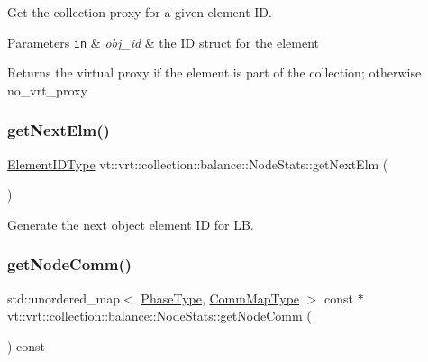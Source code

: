 Get the collection proxy for a given element ID. 


\begin{DoxyParams}[1]{Parameters}
\mbox{\tt in}  & {\em obj\+\_\+id} & the ID struct for the element\\
\hline
\end{DoxyParams}
\begin{DoxyReturn}{Returns}
the virtual proxy if the element is part of the collection; otherwise {\ttfamily no\+\_\+vrt\+\_\+proxy} 
\end{DoxyReturn}
\mbox{\label{structvt_1_1vrt_1_1collection_1_1balance_1_1_node_stats_ac1b800713117d8f017746985a66dfbd2}} 
\subsubsection{\texorpdfstring{get\+Next\+Elm()}{getNextElm()}}
{\footnotesize\ttfamily \hyperlink{namespacevt_1_1vrt_1_1collection_1_1balance_a592736f733df4f90856df90a1fd08905}{Element\+I\+D\+Type} vt\+::vrt\+::collection\+::balance\+::\+Node\+Stats\+::get\+Next\+Elm (\begin{DoxyParamCaption}{ }\end{DoxyParamCaption})}



Generate the next object element ID for LB. 

\mbox{\label{structvt_1_1vrt_1_1collection_1_1balance_1_1_node_stats_a236c9f6b9ba7446a35cbc1052949d558}} 
\subsubsection{\texorpdfstring{get\+Node\+Comm()}{getNodeComm()}}
{\footnotesize\ttfamily std\+::unordered\+\_\+map$<$ \hyperlink{namespacevt_a46ce6733d5cdbd735d561b7b4029f6d7}{Phase\+Type}, \hyperlink{namespacevt_1_1vrt_1_1collection_1_1balance_a01ee1fb0ae2da1d2ab7fdca3be9ae351}{Comm\+Map\+Type} $>$ const  $\ast$ vt\+::vrt\+::collection\+::balance\+::\+Node\+Stats\+::get\+Node\+Comm (\begin{DoxyParamCaption}{ }\end{DoxyParamCaption}) const}




